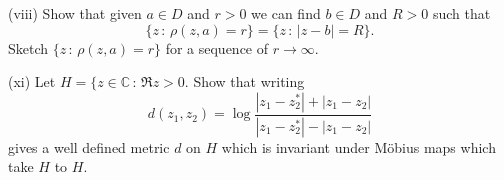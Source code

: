 \begin{exercise}

(viii) Show that given $a\in D$ and $r>0$
we can find $b\in D$ and $R>0$ such that
\[\{z\,:\,\rho(z,a)=r\}=\{z\,:\,|z-b|=R\}.\]
Sketch $\{z\,:\,\rho(z,a)=r\}$ for a sequence of $r\rightarrow\infty$.

(xi) Let $H=\{z\in{\mathbb C}\,:\,\Re z>0$. Show that
writing
\[d(z_{1},z_{2})=
\log\frac{|z_{1}-z_{2}^{*}|+|z_{1}-z_{2}|}{|z_{1}-z_{2}^{*}|-|z_{1}-z_{2}|}\]
gives a well defined metric $d$
on $H$ which is invariant under
M\"{o}bius maps which take $H$ to $H$.
\end{exercise}


